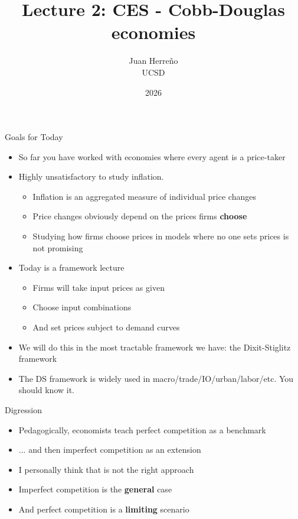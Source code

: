 \documentclass[11pt,aspectratio=169,xcolor={dvipsnames},hyperref={pdftex,pdfpagemode=UseNone,hidelinks,pdfdisplaydoctitle=true},usepdftitle=false]{beamer}
\title{Lecture 2: CES - Cobb-Douglas economies}
\author{Juan Herre\~{n}o\\UCSD}
\date{2026}
\begin{document}
\maketitle

\begin{frame}{Goals for Today}
\begin{itemize}
\item So far you have worked with economies where every agent is a price-taker
\item Highly unsatisfactory to study inflation.
\begin{itemize}
\item Inflation is an aggregated measure of individual price changes
\item Price changes obviously depend on the prices firms \textbf{choose}
\item Studying how firms choose prices in models where no one sets prices is not promising
\end{itemize}
\item Today is a framework lecture
\begin{itemize}
\item Firms will take input prices as given
\item Choose input combinations
\item And set prices subject to demand curves
\end{itemize}
\item We will do this in the most tractable framework we have: the Dixit-Stiglitz framework
\item The DS framework is widely used in macro/trade/IO/urban/labor/etc. You should know it.
\end{itemize}
\end{frame}


\begin{frame}{Digression}
\begin{itemize}
\item Pedagogically, economists teach perfect competition as a benchmark
\item ... and then imperfect competition as an extension
\item I personally think that is not the right approach
\item Imperfect competition is the \textbf{general} case
\item And perfect competition is a \textbf{limiting} scenario
\end{itemize}
\end{frame}
\end{document}
